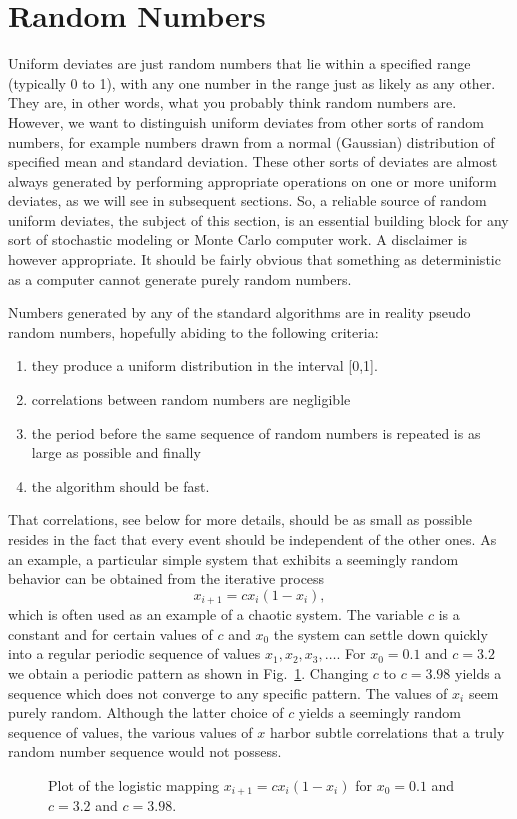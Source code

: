 \section{Random Numbers}\label{sec:randomnumbers}

Uniform deviates are just random numbers that lie within a specified range
(typically 0 to 1), with any one number in the range just as likely as any other. They
are, in other words, what you probably think random numbers are. However,
we want to distinguish uniform deviates from other sorts of random numbers, for
example numbers drawn from a normal (Gaussian) distribution of specified mean
and standard deviation. These other sorts of deviates are almost always generated by
performing appropriate operations on one or more uniform deviates, as we will see
in subsequent sections. So, a reliable source of random uniform deviates, the subject
of this section, is an essential building block for any sort of stochastic modeling
or Monte Carlo computer work.
A disclaimer is however appropriate. It should be fairly obvious that 
something as deterministic as a computer cannot generate purely random numbers.

Numbers generated by any of the standard algorithms are in reality pseudo random
numbers, hopefully abiding to the following criteria:
\begin{enumerate}
\item they produce a uniform distribution in the interval [0,1].
\item correlations between random numbers are negligible
\item the period before the same sequence of random numbers is repeated
      is as large as possible and finally
\item the algorithm should be fast. 
\end{enumerate}

That correlations, see below for more details, should be as
small as possible resides in the fact that every event should be independent
of the other ones. As an example, a particular simple system that exhibits
a seemingly random behavior can be obtained from the iterative process
\[
   x_{i+1}=cx_i(1-x_i),
\]
which is often used as an example of a chaotic system. The variable $c$ is a constant and for certain
values of $c$ and $x_0$ the system can settle down quickly into a regular
periodic sequence of values $x_1,x_2,x_3,\dots$. For $x_0=0.1$ and $c=3.2$ 
we obtain a periodic pattern as shown in Fig.~\ref{fig:chaoticrn}. Changing
$c$ to $c=3.98$ yields a sequence which does not converge to any specific
pattern. The values of $x_i$ seem purely random. Although the latter
choice of $c$ yields a seemingly random sequence of values, the various
values of $x$ harbor subtle correlations that a truly random
number sequence would not possess. 
\begin{figure}\label{fig:chaos}
\begin{center}

\end{center}
\caption{Plot of the logistic mapping $x_{i+1}=cx_i(1-x_i)$ for $x_0=0.1$ and
$c=3.2$ and $c=3.98$.\label{fig:chaoticrn}}
\end{figure}
 
